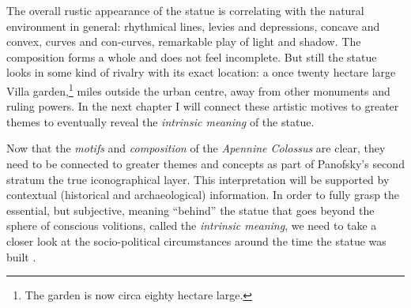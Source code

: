 The overall rustic appearance of the statue is correlating with the natural environment in general: rhythmical lines, levies and depressions, concave and convex, curves and con-curves, remarkable play of light and shadow. The composition forms a whole and does not feel incomplete. But still the statue looks in some kind of rivalry with its exact location: a once twenty hectare large Villa garden,\footnote{The garden is now circa eighty hectare large.}  miles outside the urban centre, away from other monuments and ruling powers. In the next chapter I will connect these artistic motives to greater themes to eventually reveal the \textit{intrinsic meaning} of the statue.


Now that the \textit{motifs} and \textit{composition} of the \textit{Apennine Colossus} are clear, they need to be connected to greater themes and concepts as part of  Panofsky’s second stratum the true iconographical layer. This interpretation will be supported by contextual (historical and archaeological) information. In order to fully grasp the essential, but subjective, meaning “behind” the statue that goes beyond the sphere of conscious volitions, called the \textit{intrinsic meaning}, we need to take a closer look at the socio-political circumstances around the time the statue was built \parencites[6,16]{Panofsky1963}[28-32]{Panofsky1955}.


